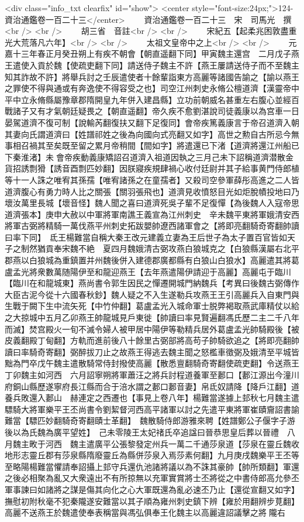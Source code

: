 <div class="info_txt clearfix" id="show">
<center style="font-size:24px;">124-資治通鑑卷一百二十三</center>
  　　資治通鑑卷一百二十三　宋　司馬光　撰<br />
<br />
　　胡三省　音註<br />
<br />
　　宋紀五【起柔兆困敦盡重光大荒落凡六年】<br />
<br />
　　太祖文皇帝中之上<br />
<br />
　　元嘉十三年春正月癸丑朔上有疾不朝會【朝直遥翻下同】甲寅魏主還宫　二月戊子燕王遣使入貢於魏【使疏吏翻下同】請送侍子魏主不許【燕王屢請送侍子而不至魏主知其詐故不許】將舉兵討之壬辰遣使者十餘輩詣東方高麗等諸國告諭之【諭以燕王之罪使不得與通或有奔逸使不得容受之也】司空江州刺史永脩公檀道濟【漢靈帝中平中立永脩縣屬豫章郡隋開皇九年併入建昌縣】立功前朝威名甚重左右腹心並經百戰諸子又有才氣朝廷疑畏之【朝直遥翻】帝久疾不愈劉湛說司徒義康以為宫車一日晏駕道濟不復可制【說輸芮翻復扶又翻下足復同】會帝疾篤義康言于帝召道濟入朝其妻向氏謂道濟曰【姓譜祁姓之後為向國向式亮翻又如字】高世之勲自古所忌今無事相召禍其至矣既至留之累月帝稍間【間如字】將遣還已下渚【道濟將還江州船已下秦淮渚】未會帝疾動義康矯詔召道濟入祖道因執之三月己未下詔稱道濟潜散金貨招誘剽猾【誘音酉剽匹妙翻】因朕寢疾規肆禍心收付廷尉并其子給事黄門侍郎植等十一人誅之唯宥其孫孺【唯宥諸孫之在童孺者】又殺司空參軍薛彤高進之二人皆道濟腹心有勇力時人比之關張【關羽張飛也】道濟見收憤怒目光如炬脫幘投地曰乃壞汝萬里長城【壞音怪】魏人聞之喜曰道濟死吳子輩不足復憚【為後魏人入寇帝思道濟張本】庚申大赦以中軍將軍南譙王義宣為江州刺史　辛未魏平東將軍娥清安西將軍古弼將精騎一萬伐燕平州刺史拓跋嬰帥遼西諸軍會之【將即亮翻騎奇寄翻帥讀曰率下同】　氐王楊難當自稱大秦王改元建義立妻為王后世子為太子置百官皆如天子之制然猶貢奉宋魏不絶　夏四月魏娥清古弼攻燕白狼城克之【白狼縣漢屬右北平郡燕以白狼城為重鎮置并州魏後併入建德郡廣都縣有白狼山白狼水】高麗遣其將葛盧孟光將衆數萬随陽伊至和龍迎燕王【去年燕遣陽伊請迎于高麗】高麗屯于臨川【臨川在和龍城東】燕尚書令郭生因民之憚遷開城門納魏兵【考異曰後魏古弼傳作大臣古泥今從十六國春秋鈔】魏人疑之不入生遂勒兵攻燕王王引高麗兵入自東門與生戰于闕下生中流矢死【中竹仲翻】葛盧孟光入城命軍士脱弊褐取燕武庫精仗以給之大掠城中五月乙卯燕王帥龍城見戶東徙【帥讀曰率見賢遍翻馮氏歷二主二千八年而滅】焚宫殿火一旬不滅令婦人被甲居中陽伊等勒精兵居外葛盧孟光帥騎殿後【被皮義翻殿丁甸翻】方軌而進前後八十餘里古弼部將高苟子帥騎欲追之【將即亮翻帥讀曰率騎奇寄翻】弼醉拔刀止之故燕王得逃去魏主聞之怒檻車徵弼及娥清至平城皆黜為門卒戊午魏主遣散騎常侍封撥使高麗【散悉亶翻騎奇寄翻使疏吏翻】令送燕王　丁卯魏主如河西　六月詔寧朔將軍蕭汪之將兵討程道養軍至郪口【郪江源出今潼川府銅山縣歷遂寧府長江縣而合于涪水謂之郪口郪音妻】帛氐奴請降【降戶江翻】道養兵敗還入郪山　赫連定之西遷也【事見上卷八年】楊難當遂據上邽秋七月魏主遣驃騎大將軍樂平王丕尚書令劉絜督河西高平諸軍以討之先遣平東將軍崔賾齎詔書諭難當【驃匹妙翻騎奇寄翻賾士革翻】　魏散騎侍郎游雅來聘【姓譜鄭公子偃字子游後以為氏魏為廣平望姓】　己未零陵王太妃禇氏卒追諡曰晉恭思皇后葬以晉禮　八月魏主畋于河西　魏主遣廣平公張黎發定州兵一萬二千通莎泉道【莎泉在靈丘魏收地形志靈丘郡有莎泉縣隋廢靈丘為縣併莎泉入焉莎素何翻】九月庚戌魏樂平王丕等至略陽楊難當懼請奉詔攝上邽守兵還仇池諸將議以為不誅其豪帥【帥所類翻】軍還之後必相聚為亂又大衆遠出不有所掠無以充軍實賞將士丕將從之中書侍郎高允參丕軍事諫曰如諸將之謀是傷其向化之心大軍既還為亂必速丕乃止【還從宣翻又如字】撫慰初附秋毫不犯秦隴遂安難當以其子順為雍州刺史鎮下辨【雍於用翻辨步莧翻】　高麗不送燕王於魏遣使奉表稱當與馮弘俱奉王化魏主以高麗違詔議擊之將隴右